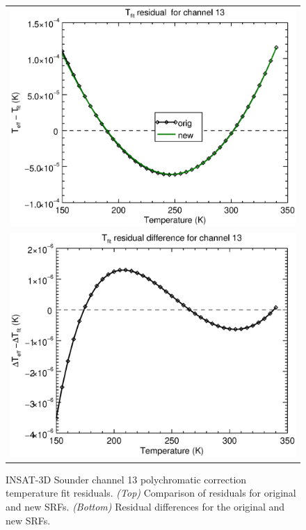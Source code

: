 \begin{figure}[H]
  \centering
  \begin{tabular}{c}
    \includegraphics[scale=0.55]{graphics/sndr/tfit/sndr_insat3d-13.tfit.eps} \\
    \includegraphics[scale=0.55]{graphics/sndr/tfit/sndr_insat3d-13.tfit.difference.eps}
  \end{tabular}
  \caption{INSAT-3D Sounder channel 13 polychromatic correction temperature fit residuals. \emph{(Top)} Comparison of residuals for original and new SRFs. \emph{(Bottom)} Residual differences for the original and new SRFs.}
  \label{fig:sndr_ch13_tfit}
\end{figure}


